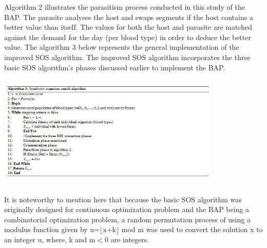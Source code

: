 \documentclass{article}
\begin{document}
Algorithm 2 illustrates the parasitism process conducted in this study of the BAP. The parasite analyses the host and swaps segments if the host contains a better value than itself. The values for both the host and parasite are matched against the demand for the day (per blood type) in order to deduce the better value. The algorithm 3 below represents the general implementation of the improved SOS algorithm. The improved SOS algorithm incorporates the three basic SOS algorithm’s phases discussed earlier to implement the BAP.\\
\\
\includegraphics[width=0.8\textwidth, center]{Images/Alg3.JPG}
\\
\\
It is noteworthy to mention here that because the basic SOS algorithm was originally designed for continuous optimization problem and the BAP being a combinatorial optimization problem, a random permutation process of using a modulus function given by u=$⌊$x+k$⌋$ mod m was used to convert the solution x to an integer u, where, k and m$<$0 are integers.  
\end{document}
